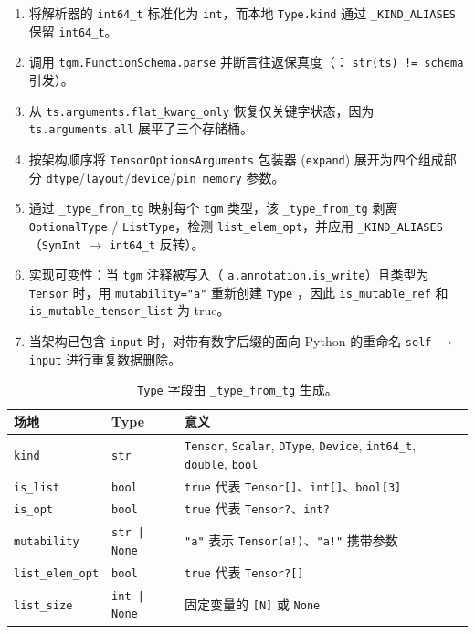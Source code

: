 \begin{enumerate}[nosep, leftmargin=1.2em]
\item 将解析器的 \texttt{int64\_t} 标准化为 \texttt{int}，而本地 \texttt{Type.kind} 通过 \texttt{\_KIND\_ALIASES} 保留 \texttt{int64\_t}。
\item 调用 \texttt{tgm.FunctionSchema.parse} 并断言往返保真度（： \texttt{str(ts) != schema} 引发）。
\item 从 \texttt{ts.arguments.flat\_kwarg\_only} 恢复仅关键字状态，因为 \texttt{ts.arguments.all} 展平了三个存储桶。
\item 按架构顺序将 \texttt{TensorOptionsArguments} 包装器 (\texttt{expand}) 展开为四个组成部分 \texttt{dtype}/\texttt{layout}/\texttt{device}/\texttt{pin\_memory} 参数。
\item 通过 \texttt{\_type\_from\_tg} 映射每个 \texttt{tgm} 类型，该 \texttt{\_type\_from\_tg} 剥离 \texttt{OptionalType} / \texttt{ListType}，检测 \texttt{list\_elem\_opt}，并应用 \texttt{\_KIND\_ALIASES}（\texttt{SymInt} $\rightarrow$ \texttt{int64\_t} 反转）。
\item 实现可变性：当 \texttt{tgm} 注释被写入（ \texttt{a.annotation.is\_write}）且类型为 \texttt{Tensor} 时，用 \texttt{mutability="a"} 重新创建 \texttt{Type} ，因此 \texttt{is\_mutable\_ref} 和 \texttt{is\_mutable\_tensor\_list} 为 true。
\item 当架构已包含 \texttt{input} 时，对带有数字后缀的面向 Python 的重命名 \texttt{self} $\rightarrow$ \texttt{input} 进行重复数据删除。
\end{enumerate}

\begin{table}[H]
\centering
\caption{\texttt{Type} 字段由 \texttt{\_type\_from\_tg} 生成。}
\label{tab:typefields}
\small
\begin{tabular}{lll}
\toprule
场地 & Type & 意义 \\
\midrule
\texttt{kind} & \texttt{str} & \texttt{Tensor}, \texttt{Scalar}, \texttt{DType}, \texttt{Device}, \texttt{int64\_t}, \texttt{double}, \texttt{bool} \\
\texttt{is\_list} & \texttt{bool} & \texttt{true} 代表 \texttt{Tensor[]}、\texttt{int[]}、\texttt{bool[3]} \\
\texttt{is\_opt} & \texttt{bool} & \texttt{true} 代表 \texttt{Tensor?}、\texttt{int?} \\
\texttt{mutability} & \texttt{str | None} & \texttt{"a"} 表示 \texttt{Tensor(a!)}、\texttt{"a!"} 携带参数 \\
\texttt{list\_elem\_opt} & \texttt{bool} & \texttt{true} 代表 \texttt{Tensor?[]} \\
\texttt{list\_size} & \texttt{int | None} & 固定变量的 \texttt{[N]} 或 \texttt{None} \\
\bottomrule
\end{tabular}
\end{table}

